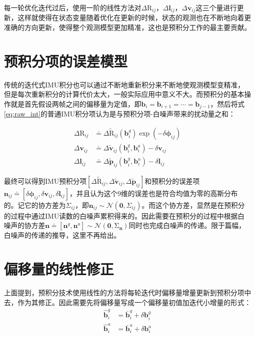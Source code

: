 每一轮优化迭代过后，使用一阶的线性方法对$\Delta\mathrm{R}_{ij}$，$\Delta\bm{l}_{ij}$，$\Delta\bm{v}_{ij}$这三个量进行更新，这样就使得在状态变量随着优化在更新的时候，状态的观测也在不断地向着更准确的方向更新，使得整个观测模型更加精准，这也是预积分工作的最主要贡献。

\section{预积分项的误差模型}

传统的迭代式IMU积分也可以通过不断地重新积分来不断地使观测模型变精准，但是每次重新积分的计算代价太大，一般实际应用中意义不大。而预积分的基本操作就是首先假设两帧之间的偏移量为定值，即$\bm{b}_i = \bm{b}_{i+1} = \cdots = \bm{b}_{j-1}$，然后将式\eqref{eq:raw_int}的普通IMU积分项认为是与预积分项-白噪声带来的扰动量之和：

\begin{equation}
\begin{aligned}
    \Delta\mathrm{R}_{ij} &\doteq
        \Delta\tilde{\mathrm R}_{ij}(\bm{b}^g_i) \exp(-\delta\bm\phi_{ij}) \\
    \Delta\bm{v}_{ij} &\doteq
        \Delta\tilde{\bm v}_{ij}(\bm{b}^g_i, \bm{b}^a_i) - \delta\bm{v}_{ij} \\
    \Delta\bm{l}_{ij} &\doteq
        \Delta\tilde{\bm p}_{ij}(\bm{b}^g_i, \bm{b}^a_i) - \delta\bm{l}_{ij}
\end{aligned}
\end{equation}

最终可以得到IMU预积分项$\left[\Delta\tilde{\mathrm R}_{ij},\Delta\tilde{\bm v}_{ij},\Delta\tilde{\bm p}_{ij}\right]$和预积分的误差项$\bm{n}_{ij} \doteq \left[\delta\bm\phi_{ij},\delta\bm{v}_{ij},\delta\bm{l}_{ij}\right]$，并且认为这个$9$维的误差也是符合均值为零的高斯分布的。记它的协方差为$\Sigma_{ij}$，即$\bm{n}_{ij} \sim \mathcal{N}\left(\bm{0},\Sigma_{ij}\right)$。而这个协方差，显然是在预积分的过程中通过IMU读数的白噪声累积得来的。因此需要在预积分的过程中根据白噪声的协方差$\bm{n} \doteq \left[\bm{n}^g,\bm{n}^a\right] \sim \mathcal{N}(\bm{0},\mathrm\Sigma_{\bm{n}})$同时也完成白噪声的传递。限于篇幅，白噪声的传递的推导，这里不再给出。

\section{偏移量的线性修正}

上面提到，预积分技术使用线性的方法将每轮迭代时偏移量增量更新到预积分项中去，作为其修正。因此需要先将偏移量写成一个偏移量初值加迭代小增量的形式：
\begin{equation}
\begin{aligned}
    \hat{\bm b}^g_i &= \bar{\bm b}^g_i + \delta\bm{b}^g_i \\
    \hat{\bm b}^a_i &= \bar{\bm b}^a_i + \delta\bm{b}^a_i
\end{aligned}
\end{equation}

